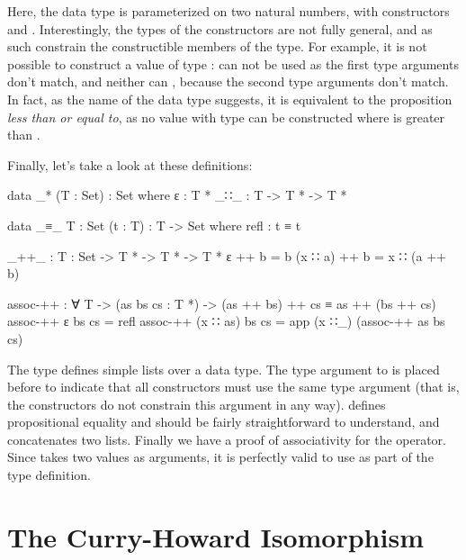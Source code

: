 	Here, the data type  is parameterized on two natural numbers,
	with constructors  and . Interestingly, the types of
	the constructors are not fully general, and as such constrain the
	constructible members of the type. For example, it is not possible to
	construct a value of type :  can not be
	used as the first type arguments don't match, and neither can ,
	because the second type arguments don't match. In fact, as the name of the
	data type suggests, it is equivalent to the proposition \emph{less than or
	equal to}, as no value with type  can be constructed where
	 is greater than .

	Finally, let's take a look at these definitions:

	\begin{code}

		data _* (T : Set) : Set where
		  ε : T *
		  _∷_ : T -> T * -> T *
		
		data _≡_ {T : Set} (t : T) : T -> Set where
		  refl : t ≡ t
		
		_++_ : {T : Set} -> T * -> T * -> T *
		ε ++ b = b
		(x ∷ a) ++ b = x ∷ (a ++ b)
		
		assoc-++ : ∀ {T} -> (as bs cs : T *) -> (as ++ bs) ++ cs ≡ as ++ (bs ++ cs)
		assoc-++ ε bs cs = refl
		assoc-++ (x ∷ as) bs cs = app (x ∷_) (assoc-++ as bs cs)

	\end{code}

	The type \codett{\_*} defines simple lists over a data type. The type
	argument to \codett{\_*} is placed before \codett{:} to indicate that all
	constructors must use the same type argument (that is, the constructors do
	not constrain this argument in any way).  defines
	propositional equality and should be fairly straightforward to understand,
	and \codett{\_++\_} concatenates two lists. Finally we have a proof of
	associativity for the \codett{\_++\_} operator. Since  takes
	two values as arguments, it is perfectly valid to use \codett{\_++\_} as
	part of the type definition.

	\section{The Curry-Howard Isomorphism}
